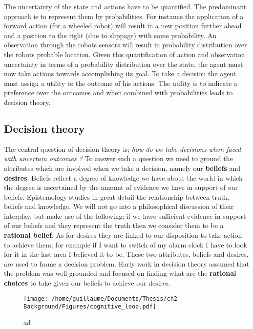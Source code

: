 The uncertainty of the state and actions have to be quantified. The predominant approach 
is to  represent them by probabilities. For instance the application of a forward action (for a wheeled robot) 
will result in a new position further ahead and a position to the right (due to slippage) with some probability.
An observation through the robots sensors will result in probability distribution over the robots probable location.
Given this quantification of action and observation uncertainty in terms of a probability distribution over the state, 
the agent must now take actions towards accomplishing its goal. To take a decision the agent must assign a utility 
to the outcome of his actions. The utility is to indicate a preference over the outcomes and when combined with 
probabilities leads to decision theory. 

\subsection{Decision theory}

The central question of decision theory is; \textit{how do we take decisions when faced with uncertain outcomes ?} To answer
such a question we need to ground the attributes which are involved when we take a decision, namely our \textbf{beliefs} and 
\textbf{desires}. Beliefs reflect a degree of knowledge we have about the world in which the degree is ascertained by 
the amount of evidence we have in support of our beliefs. Epistemology studies in great detail the relationship between 
truth, beliefs and knowledge. We will not go into a philosophical discussion of their interplay, but make use of the following; 
if we have sufficient evidence in support of our beliefs and they represent the truth then we consider them to 
be a \textbf{rational belief}. As for desires they are linked to our disposition to take action to achieve them; for 
example if I want to switch of my alarm clock I have to look for it in the last area I believed it to be. 
These two attributes, beliefs and desires, are used to frame a decision problem. Early work in decision theory assumed 
that the problem was well grounded and focused on finding what are the \textbf{rational choices} to take given our beliefs 
to achieve our desires. 

\begin{figure}
 \centering
 \texttt{[image: /home/guillaume/Documents/Thesis/ch2-Background/Figures/cognitive\_loop.pdf]}
  \caption{ad}
\end{figure}

